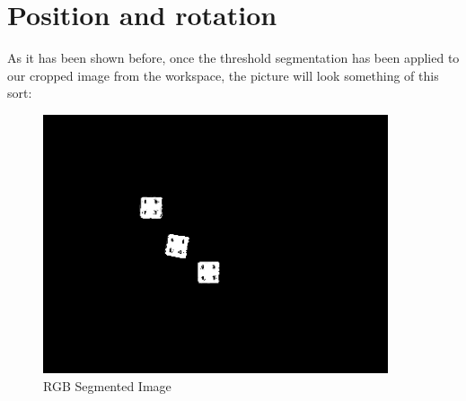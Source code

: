 \chapter{Position and rotation}\label{ch:position_rotation}

As it has been shown before, once the threshold segmentation has been applied to our cropped image from the workspace, the picture will look something of this sort:

\begin{figure}[hb]
  \centering
  \includegraphics[width=4in]{figures/thresh_img.png}
  \caption[thresholded_image] {RGB Segmented Image}
\end{figure}

